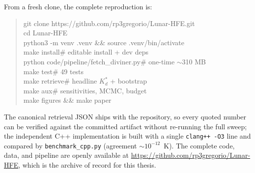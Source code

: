 \documentclass[11pt,a4paper,oneside]{report}
\begin{document}
From a fresh clone, the complete reproduction is:
\begin{quote}\ttfamily
git clone https://github.com/rp3gregorio/Lunar-HFE.git\\
cd Lunar-HFE\\
python3 -m venv .venv \&\& source .venv/bin/activate\\
make install\phantom{xxxxxxxx}\# editable install + dev deps\\
python code/pipeline/fetch\_diviner.py\phantom{xx}\# one-time
$\sim$310 MB\\
make test\phantom{xxxxxxxxxxx}\# 49 tests\\
make retrieve\phantom{xxxxxxx}\# headline $K_d^{*}$ + bootstrap\\
make aux\phantom{xxxxxxxxxxxx}\# sensitivities, MCMC, budget\\
make figures \&\& make paper
\end{quote}
\noindent The canonical retrieval JSON ships with the repository, so
every quoted number can be verified against the committed artifact
without re-running the full sweep; the independent C++
implementation is built with a single \texttt{clang++ -O3} line and
compared by \texttt{benchmark\_cpp.py} (agreement
${\sim}10^{-12}$~K). The complete code, data, and pipeline are openly
available at \url{https://github.com/rp3gregorio/Lunar-HFE}, which is
the archive of record for this thesis.



\end{document}
